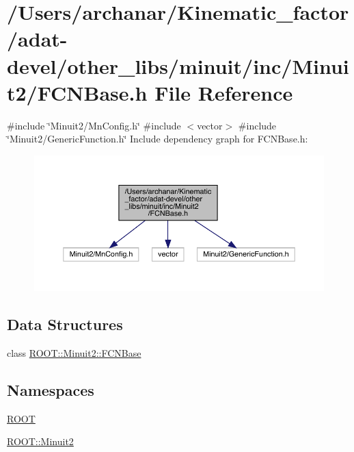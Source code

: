 \hypertarget{adat-devel_2other__libs_2minuit_2inc_2Minuit2_2FCNBase_8h}{}\section{/\+Users/archanar/\+Kinematic\+\_\+factor/adat-\/devel/other\+\_\+libs/minuit/inc/\+Minuit2/\+F\+C\+N\+Base.h File Reference}
\label{adat-devel_2other__libs_2minuit_2inc_2Minuit2_2FCNBase_8h}
{\ttfamily \#include \char`\"{}Minuit2/\+Mn\+Config.\+h\char`\"{}}\newline
{\ttfamily \#include $<$vector$>$}\newline
{\ttfamily \#include \char`\"{}Minuit2/\+Generic\+Function.\+h\char`\"{}}\newline
Include dependency graph for F\+C\+N\+Base.\+h\+:
\nopagebreak
\begin{figure}[H]
\begin{center}
\leavevmode
\includegraphics[width=350pt]{d3/dda/adat-devel_2other__libs_2minuit_2inc_2Minuit2_2FCNBase_8h__incl}
\end{center}
\end{figure}
\subsection*{Data Structures}
\begin{DoxyCompactItemize}
\item 
class \mbox{\hyperlink{classROOT_1_1Minuit2_1_1FCNBase}{R\+O\+O\+T\+::\+Minuit2\+::\+F\+C\+N\+Base}}
\end{DoxyCompactItemize}
\subsection*{Namespaces}
\begin{DoxyCompactItemize}
\item 
 \mbox{\hyperlink{namespaceROOT}{R\+O\+OT}}
\item 
 \mbox{\hyperlink{namespaceROOT_1_1Minuit2}{R\+O\+O\+T\+::\+Minuit2}}
\end{DoxyCompactItemize}
